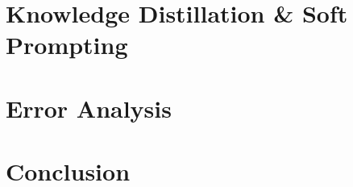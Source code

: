 \documentclass{article}
\begin{document}

\section{Knowledge Distillation \& Soft Prompting}
\label{knowledge-distillation}

\section{Error Analysis}
\label{error-analysis}

\section{Conclusion}
\label{Conclusion}



\end{document}
